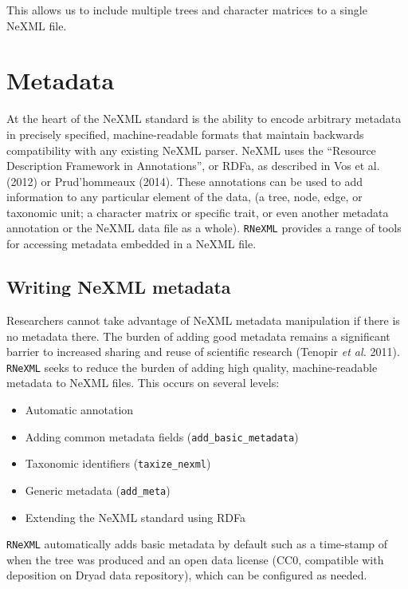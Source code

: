 \documentclass[author-year, review, 11pt]{components/elsarticle} %
\begin{document}
This allows us to include multiple trees and character matrices to a
single NeXML file.

\section{Metadata}\label{metadata}

At the heart of the NeXML standard is the ability to encode arbitrary
metadata in precisely specified, machine-readable formats that maintain
backwards compatibility with any existing NeXML parser. NeXML uses the
``Resource Description Framework in Annotations'', or RDFa, as described
in Vos et al. (2012) or Prud'hommeaux (2014). These annotations can be
used to add information to any particular element of the data, (a tree,
node, edge, or taxonomic unit; a character matrix or specific trait, or
even another metadata annotation or the NeXML data file as a whole).
\texttt{RNeXML} provides a range of tools for accessing metadata
embedded in a NeXML file.

\subsection{Writing NeXML metadata}\label{writing-nexml-metadata}

Researchers cannot take advantage of NeXML metadata manipulation if
there is no metadata there. The burden of adding good metadata remains a
significant barrier to increased sharing and reuse of scientific
research (Tenopir \emph{et al.} 2011). \texttt{RNeXML} seeks to reduce
the burden of adding high quality, machine-readable metadata to NeXML
files. This occurs on several levels:

\begin{itemize}
\itemsep1pt\parskip0pt
\item
  Automatic annotation
\item
  Adding common metadata fields (\texttt{add\_basic\_metadata})
\item
  Taxonomic identifiers (\texttt{taxize\_nexml})
\item
  Generic metadata (\texttt{add\_meta})
\item
  Extending the NeXML standard using RDFa
\end{itemize}

\texttt{RNeXML} automatically adds basic metadata by default such as a
time-stamp of when the tree was produced and an open data license (CC0,
compatible with deposition on Dryad data repository), which can be
configured as needed.
\end{document}
